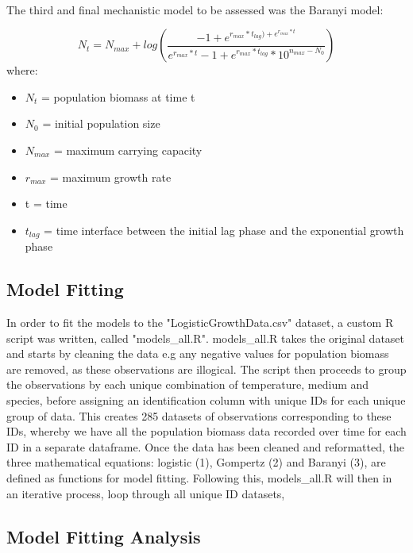 \documentclass[11pt, a4paper]{article} %
\begin{document}
\paragraph{} The third and final mechanistic model to be assessed was the Baranyi model:

\begin{equation}
N_t = N_{max} + log(\frac{-1 + e^{r_{max} * t_{lag}) + e^{r_{max} * t}}}{e^{r_{max} * t} - 1 + e^{r_{max} * t_{lag}} * 10^{n_{max} - N_0}})
\end{equation}
where:
\begin{itemize}
\item $N_t$ = population biomass at time t
\item $N_0$ = initial population size
\item $N_{max}$ = maximum carrying capacity
\item $r_{max}$ = maximum growth rate
\item t = time
\item $t_{lag}$ = time interface between the initial lag phase and the exponential growth phase
\end{itemize}

\subsection{Model Fitting}

In order to fit the models to the "LogisticGrowthData.csv" dataset, a custom R script was written, called "models\_all.R". models\_all.R takes the original dataset and starts by cleaning the data e.g any negative values for population biomass are removed, as these observations are illogical. The script then proceeds to group the observations by each unique combination of temperature, medium and species, before assigning an identification column with unique IDs for each unique group of data. This creates 285 datasets of observations corresponding to these IDs, whereby we have all the population biomass data recorded over time for each ID in a separate dataframe. Once the data has been cleaned and reformatted, the three mathematical equations: logistic (1), Gompertz (2) and Baranyi (3), are defined as functions for model fitting. Following this, models\_all.R will then in an iterative process, loop through all unique ID datasets, 

\subsection{Model Fitting Analysis}
\end{document}
